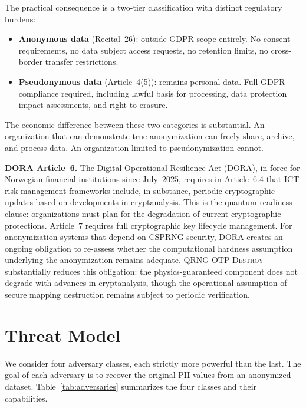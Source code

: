 \documentclass[journal]{IEEEtran}
\begin{document}
The practical consequence is a two-tier classification with distinct regulatory burdens:

\begin{itemize}
\item \textbf{Anonymous data} (Recital~26): outside GDPR scope entirely. No consent requirements, no data subject access requests, no retention limits, no cross-border transfer restrictions.
\item \textbf{Pseudonymous data} (Article~4(5)): remains personal data. Full GDPR compliance required, including lawful basis for processing, data protection impact assessments, and right to erasure.
\end{itemize}

The economic difference between these two categories is substantial. An organization that can demonstrate true anonymization can freely share, archive, and process data. An organization limited to pseudonymization cannot.

\textbf{DORA Article~6.} The Digital Operational Resilience Act (DORA), in force for Norwegian financial institutions since July~2025, requires in Article~6.4 that ICT risk management frameworks include, in substance, periodic cryptographic updates based on developments in cryptanalysis. This is the quantum-readiness clause: organizations must plan for the degradation of current cryptographic protections. Article~7 requires full cryptographic key lifecycle management. For anonymization systems that depend on CSPRNG security, DORA creates an ongoing obligation to re-assess whether the computational hardness assumption underlying the anonymization remains adequate. \textsc{QRNG-OTP-Destroy} substantially reduces this obligation: the physics-guaranteed component does not degrade with advances in cryptanalysis, though the operational assumption of secure mapping destruction remains subject to periodic verification.

\section{Threat Model}
\label{sec:threat}

We consider four adversary classes, each strictly more powerful than the last. The goal of each adversary is to recover the original PII values from an anonymized dataset. Table~\ref{tab:adversaries} summarizes the four classes and their capabilities.
\end{document}
